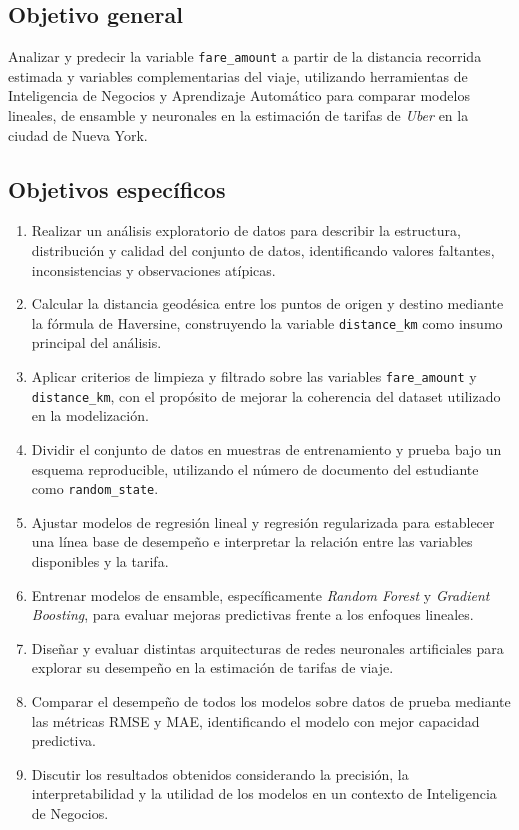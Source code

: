 \documentclass[10pt]{article}
\begin{document}
	\subsection{Objetivo general}

	Analizar y predecir la variable \texttt{fare\_amount} a partir de la distancia recorrida estimada y variables complementarias del viaje, utilizando herramientas de Inteligencia de Negocios y Aprendizaje Automático para comparar modelos lineales, de ensamble y neuronales en la estimación de tarifas de \textit{Uber} en la ciudad de Nueva York.

	\subsection{Objetivos específicos}

	\begin{enumerate}[label=\textbf{O\arabic*.}]
		\item Realizar un análisis exploratorio de datos para describir la estructura, distribución y calidad del conjunto de datos, identificando valores faltantes, inconsistencias y observaciones atípicas.

		\item Calcular la distancia geodésica entre los puntos de origen y destino mediante la fórmula de Haversine, construyendo la variable \texttt{distance\_km} como insumo principal del análisis.

		\item Aplicar criterios de limpieza y filtrado sobre las variables \texttt{fare\_amount} y \texttt{distance\_km}, con el propósito de mejorar la coherencia del dataset utilizado en la modelización.

		\item Dividir el conjunto de datos en muestras de entrenamiento y prueba bajo un esquema reproducible, utilizando el número de documento del estudiante como \texttt{random\_state}.

		\item Ajustar modelos de regresión lineal y regresión regularizada para establecer una línea base de desempeño e interpretar la relación entre las variables disponibles y la tarifa.

		\item Entrenar modelos de ensamble, específicamente \textit{Random Forest} y \textit{Gradient Boosting}, para evaluar mejoras predictivas frente a los enfoques lineales.

		\item Diseñar y evaluar distintas arquitecturas de redes neuronales artificiales para explorar su desempeño en la estimación de tarifas de viaje.

		\item Comparar el desempeño de todos los modelos sobre datos de prueba mediante las métricas RMSE y MAE, identificando el modelo con mejor capacidad predictiva.

		\item Discutir los resultados obtenidos considerando la precisión, la interpretabilidad y la utilidad de los modelos en un contexto de Inteligencia de Negocios.
	\end{enumerate}
\end{document}
